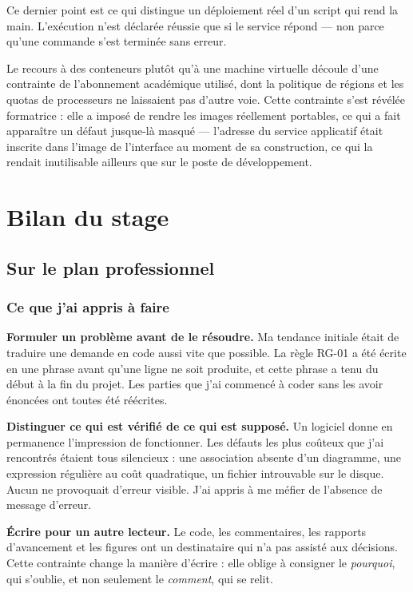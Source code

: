 \documentclass[12pt,a4paper]{report}
\begin{document}
Ce dernier point est ce qui distingue un déploiement réel d'un script qui rend
la main. L'exécution n'est déclarée réussie que si le service répond ---
non parce qu'une commande s'est terminée sans erreur.

Le recours à des conteneurs plutôt qu'à une machine virtuelle découle d'une
contrainte de l'abonnement académique utilisé, dont la politique de régions et
les quotas de processeurs ne laissaient pas d'autre voie. Cette contrainte
s'est révélée formatrice : elle a imposé de rendre les images réellement
portables, ce qui a fait apparaître un défaut jusque-là masqué --- l'adresse du
service applicatif était inscrite dans l'image de l'interface au moment de sa
construction, ce qui la rendait inutilisable ailleurs que sur le poste de
développement.

\chapter{Bilan du stage}

\section{Sur le plan professionnel}

\subsection{Ce que j'ai appris à faire}

\textbf{Formuler un problème avant de le résoudre.} Ma tendance initiale était
de traduire une demande en code aussi vite que possible. La règle RG-01 a été
écrite en une phrase avant qu'une ligne ne soit produite, et cette phrase a
tenu du début à la fin du projet. Les parties que j'ai commencé à coder sans
les avoir énoncées ont toutes été réécrites.

\textbf{Distinguer ce qui est vérifié de ce qui est supposé.} Un logiciel
donne en permanence l'impression de fonctionner. Les défauts les plus coûteux
que j'ai rencontrés étaient tous silencieux : une association absente d'un
diagramme, une expression régulière au coût quadratique, un fichier
introuvable sur le disque. Aucun ne provoquait d'erreur visible. J'ai appris à
me méfier de l'absence de message d'erreur.

\textbf{Écrire pour un autre lecteur.} Le code, les commentaires, les rapports
d'avancement et les figures ont un destinataire qui n'a pas assisté aux
décisions. Cette contrainte change la manière d'écrire : elle oblige à
consigner le \emph{pourquoi}, qui s'oublie, et non seulement le
\emph{comment}, qui se relit.
\end{document}
